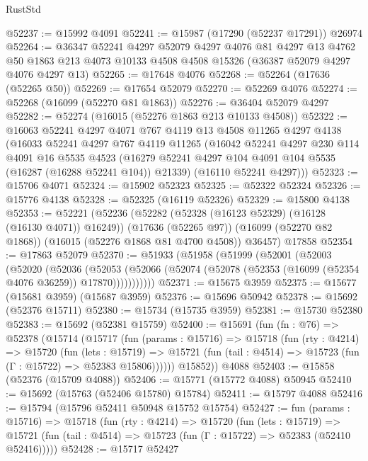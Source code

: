 \begin{lexlean}{RustStd}
\begin{coremodule}
@52237 := @15992 @4091
@52241 := @15987 (@17290 (@52237 @17291)) @26974
@52264 := @36347
    @52241
    @4297
    @52079
    @4297
    @4076
    @81
    @4297
    @13
    @4762
    @50
    @1863
    @213
    @4073
    @10133
    @4508
    @4508
    @15326
    (@36387 @52079 @4297 @4076 @4297 @13)
@52265 := @17648 @4076
@52268 := @52264 (@17636 (@52265 @50))
@52269 := @17654 @52079
@52270 := @52269 @4076
@52274 := @52268 (@16099 (@52270 @81 @1863))
@52276 := @36404 @52079 @4297
@52282 := @52274 (@16015 (@52276 @1863 @213 @10133 @4508))
@52322 := @16063
    @52241
    @4297
    @4071
    @767
    @4119
    @13
    @4508
    @11265
    @4297
    @4138
    (@16033
      @52241
      @4297
      @767
      @4119
      @11265
      (@16042
        @52241
        @4297
        @230
        @114
        @4091
        @16
        @5535
        @4523
        (@16279 @52241 @4297 @104 @4091 @104 @5535 (@16287 (@16288 @52241 @104)) @21339)
        (@16110 @52241 @4297)))
@52323 := @15706 @4071
@52324 := @15902 @52323
@52325 := @52322 @52324
@52326 := @15776 @4138
@52328 := @52325 (@16119 @52326)
@52329 := @15800 @4138
@52353 := @52221
    (@52236
      (@52282 (@52328 (@16123 @52329) (@16128 (@16130 @4071)) @16249))
      (@17636 (@52265 @97))
      (@16099 (@52270 @82 @1868))
      (@16015 (@52276 @1868 @81 @4700 @4508))
      @36457)
    @17858
@52354 := @17863 @52079
@52370 := @51933
    (@51958
      (@51999
        (@52001
          (@52003
            (@52020
              (@52036
                (@52053
                  (@52066 (@52074 (@52078 (@52353 (@16099 (@52354 @4076 @36259)) @17870)))))))))))
@52371 := @15675 @3959
@52375 := @15677 (@15681 @3959) (@15687 @3959)
@52376 := @15696 @50942
@52378 := @15692 (@52376 @15711)
@52380 := @15734 (@15735 @3959)
@52381 := @15730 @52380
@52383 := @15692 (@52381 @15759)
@52400 := @15691
    (fun (fn : @76) =>
    @52378
      (@15714
        (@15717
          (fun (params : @15716) =>
          @15718
            (fun (rty : @4214) =>
            @15720
              (fun (lets : @15719) =>
              @15721 (fun (tail : @4514) => @15723 (fun (Γ : @15722) => @52383 @15806))))))
        @15852))
    @4088
@52403 := @15858 (@52376 (@15709 @4088))
@52406 := @15771 (@15772 @4088) @50945
@52410 := @15692 (@15763 (@52406 @15780) @15784)
@52411 := @15797 @4088
@52416 := @15794 (@15796 @52411 @50948 @15752 @15754)
@52427 := fun (params : @15716) =>
  @15718
    (fun (rty : @4214) =>
    @15720
      (fun (lets : @15719) =>
      @15721 (fun (tail : @4514) => @15723 (fun (Γ : @15722) => @52383 (@52410 @52416)))))
@52428 := @15717 @52427

\end{coremodule}
\end{lexlean}
